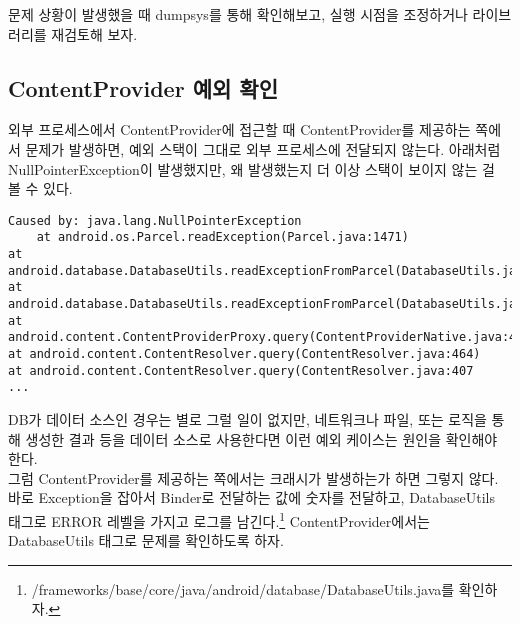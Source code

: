 문제 상황이 발생했을 때 dumpsys를 통해 확인해보고, 실행 시점을 조정하거나 라이브러리를 재검토해 보자.

\subsection{ContentProvider 예외 확인}
외부 프로세스에서 ContentProvider에 접근할 때 ContentProvider를 제공하는 쪽에서 문제가 발생하면, 예외 스택이 그대로 외부 프로세스에 전달되지 않는다.
아래처럼 NullPointerException이 발생했지만, 왜 발생했는지 더 이상 스택이 보이지 않는 걸 볼 수 있다.
\begin{lstlisting}[frame=single] 
Caused by: java.lang.NullPointerException 
	at android.os.Parcel.readException(Parcel.java:1471) 
at android.database.DatabaseUtils.readExceptionFromParcel(DatabaseUtils.java:185) 
at android.database.DatabaseUtils.readExceptionFromParcel(DatabaseUtils.java:137) 
at android.content.ContentProviderProxy.query(ContentProviderNative.java:413) 
at android.content.ContentResolver.query(ContentResolver.java:464) 
at android.content.ContentResolver.query(ContentResolver.java:407
...
\end{lstlisting}
DB가 데이터 소스인 경우는 별로 그럴 일이 없지만, 네트워크나 파일, 또는 로직을 통해 생성한 결과 등을 데이터 소스로 사용한다면 이런 예외 케이스는 원인을 확인해야 한다.\\

그럼 ContentProvider를 제공하는 쪽에서는 크래시가 발생하는가 하면 그렇지 않다. 바로 Exception을 잡아서 Binder로 전달하는 값에 숫자를 전달하고, DatabaseUtils 태그로 ERROR 레벨을 가지고 로그를 남긴다.\footnote{/frameworks/base/core/java/android/database/DatabaseUtils.java를 확인하자.}
ContentProvider에서는 DatabaseUtils 태그로 문제를 확인하도록 하자.

